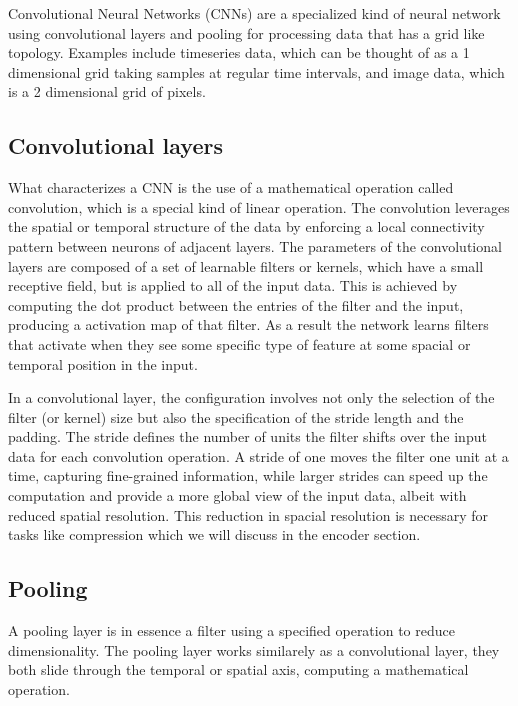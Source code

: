 Convolutional Neural Networks (CNNs)\cite{CNNs} are a specialized kind of neural network using convolutional layers and pooling for processing data that has a grid like topology. Examples include timeseries data, which can be thought of as a 1 dimensional grid taking samples at regular time intervals, and image data, which is a 2 dimensional grid of pixels.

\subsection{Convolutional layers}
What characterizes a CNN is the use of a mathematical operation called convolution, which is a special kind of linear operation. The convolution leverages the spatial or temporal structure of the data by enforcing a local connectivity pattern between neurons of adjacent layers.
The parameters of the convolutional layers are composed of a set of learnable filters or kernels, which have a small receptive field, but is applied to all of the input data. This is achieved by computing the dot product between the entries of the filter and the input, producing a activation map of that filter.
As a result the network learns filters that activate when they see some specific type of feature at some spacial or temporal position in the input. 



In a convolutional layer, the configuration involves not only the selection of the filter (or kernel) size but also the specification of the stride length and the padding. The stride defines the number of units the filter shifts over the input data for each convolution operation. A stride of one moves the filter one unit at a time, capturing fine-grained information, while larger strides can speed up the computation and provide a more global view of the input data, albeit with reduced spatial resolution.
This reduction in spacial resolution is necessary for tasks like compression which we will discuss in the encoder section.

\subsection{Pooling}
A pooling layer is in essence a filter using a specified operation to reduce dimensionality. The pooling layer works similarely as a convolutional layer, they both slide through the temporal or spatial axis, computing a mathematical operation.

